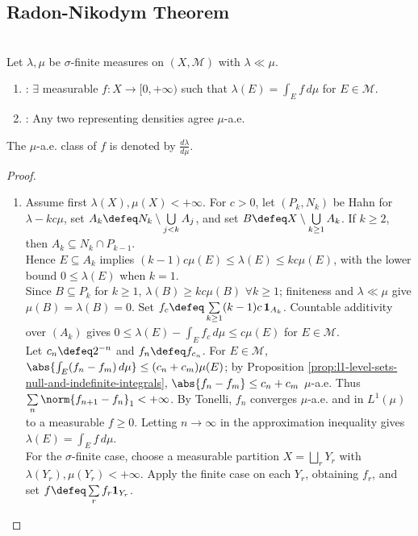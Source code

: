 \subsection{Radon-Nikodym Theorem}

\begin{theorem} \label{thm:radon-nikodym-sigma-finite} \\
Let $\lambda,\mu$ be $\sigma$-finite measures on $(X,\mathcal{M})$ with $\lambda\ll\mu$.
\begin{enumerate}[label=(\roman*)]
\setlength{\itemsep}{0pt}
\item {}: $\exists$ measurable $f:X\to[0,+\infty)$ such that $\lambda(E)=\int_Ef\,d\mu$ for $E\in\mathcal{M}$.
\item {}: Any two representing densities agree $\mu$-a.e.
\end{enumerate}
The $\mu$-a.e. class of $f$ is denoted by $\frac{d\lambda}{d\mu}$.
\begin{proof}
\begin{enumerate}[label=(\roman*)]
\setlength{\itemsep}{0pt}
\item Assume first $\lambda(X),\mu(X)<+\infty$. For $c>0$, let $(P_k,N_k)$ be Hahn for $\lambda-kc\mu$, set $A_k\defeq N_k\setminus\bigcup\limits_{j<k}A_j$, and set $B\defeq X\setminus\bigcup\limits_{k\geq1}A_k$. If $k\geq2$, then $A_k\subseteq N_k\cap P_{k-1}$.\\
Hence $E\subseteq A_k$ implies $(k-1)c\mu(E)\leq\lambda(E)\leq kc\mu(E)$, with the lower bound $0\leq\lambda(E)$ when $k=1$.\\
Since $B\subseteq P_k$ for $k\geq1$, $\lambda(B)\geq kc\mu(B)$ $\forall k\geq1$; finiteness and $\lambda\ll\mu$ give $\mu(B)=\lambda(B)=0$. Set $f_c\defeq\sum\limits_{k\geq1}(k-1)c\,\mathbf{1}_{A_k}$. Countable additivity over $(A_k)$ gives $0\leq\lambda(E)-\int_Ef_c\,d\mu\leq c\mu(E)$ for $E\in\mathcal{M}$.\\
Let $c_n\defeq2^{-n}$ and $f_n\defeq f_{c_n}$. For $E\in\mathcal{M}$, $\abs{\int_E(f_n-f_m)\,d\mu}\leq(c_n+c_m)\mu(E)$; by Proposition \ref{prop:l1-level-sets-null-and-indefinite-integrals}, $\abs{f_n-f_m}\leq c_n+c_m$ $\mu$-a.e. Thus $\sum\limits_n\norm{f_{n+1}-f_n}_1<+\infty$. By Tonelli, $f_n$ converges $\mu$-a.e. and in $L^1(\mu)$ to a measurable $f\geq0$. Letting $n\to\infty$ in the approximation inequality gives $\lambda(E)=\int_Ef\,d\mu$.\\
For the $\sigma$-finite case, choose a measurable partition $X=\bigsqcup\limits_rY_r$ with $\lambda(Y_r),\mu(Y_r)<+\infty$. Apply the finite case on each $Y_r$, obtaining $f_r$, and set $f\defeq\sum\limits_rf_r\mathbf{1}_{Y_r}$.\\

\end{enumerate}
\end{proof}
\end{theorem}
